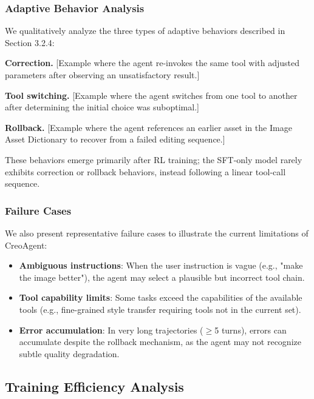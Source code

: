 \documentclass[11pt]{article}
\begin{document}
\subsubsection{Adaptive Behavior Analysis}

We qualitatively analyze the three types of adaptive behaviors described in Section 3.2.4:

\textbf{Correction.} [Example where the agent re-invokes the same tool with adjusted parameters after observing an unsatisfactory result.]

\textbf{Tool switching.} [Example where the agent switches from one tool to another after determining the initial choice was suboptimal.]

\textbf{Rollback.} [Example where the agent references an earlier asset in the Image Asset Dictionary to recover from a failed editing sequence.]

These behaviors emerge primarily after RL training; the SFT-only model rarely exhibits correction or rollback behaviors, instead following a linear tool-call sequence.

\subsubsection{Failure Cases}

We also present representative failure cases to illustrate the current limitations of CreoAgent:

\begin{itemize}
    \item \textbf{Ambiguous instructions}: When the user instruction is vague (e.g., "make the image better"), the agent may select a plausible but incorrect tool chain.
    \item \textbf{Tool capability limits}: Some tasks exceed the capabilities of the available tools (e.g., fine-grained style transfer requiring tools not in the current set).
    \item \textbf{Error accumulation}: In very long trajectories ($\geq$5 turns), errors can accumulate despite the rollback mechanism, as the agent may not recognize subtle quality degradation.
\end{itemize}

\subsection{Training Efficiency Analysis}
\end{document}
